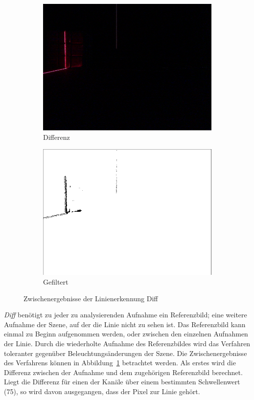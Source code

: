 \documentclass[ngerman,a4paper,parskip=half]{scrartcl}
\begin{document}
\begin{figure}[H]
\begin{subfigure}{0.23\textwidth}
	\end{subfigure}
	\hfill
	\begin{subfigure}{0.23\textwidth}
		\includegraphics[width=\textwidth]{includes/line_diff.png}
		\caption{Differenz}
	\end{subfigure}
	\hfill
	\begin{subfigure}{0.23\textwidth}
		\includegraphics[width=\textwidth,frame]{includes/line_diff_filtered.png}
		\caption{Gefiltert}
	\end{subfigure}

	\caption{Zwischenergebnisse der Linienerkennung Diff}
	\label{fig:diff}
\end{figure}

\emph{Diff} benötigt zu jeder zu analysierenden Aufnahme ein Referenzbild; eine weitere Aufnahme der Szene, auf der die Linie nicht zu sehen ist. Das Referenzbild kann einmal zu Beginn aufgenommen werden, oder zwischen den einzelnen Aufnahmen der Linie. Durch die wiederholte Aufnahme des Referenzbildes wird das Verfahren toleranter gegenüber Beleuchtungsänderungen der Szene.
Die Zwischenergebnisse des Verfahrens können in Abbildung~\ref{fig:diff} betrachtet werden. Als erstes wird die Differenz zwischen der Aufnahme und dem zugehörigen Referenzbild berechnet.
Liegt die Differenz für einen der Kanäle über einem bestimmten Schwellenwert (75), so wird davon ausgegangen, dass der Pixel zur Linie gehört.
\end{document}
